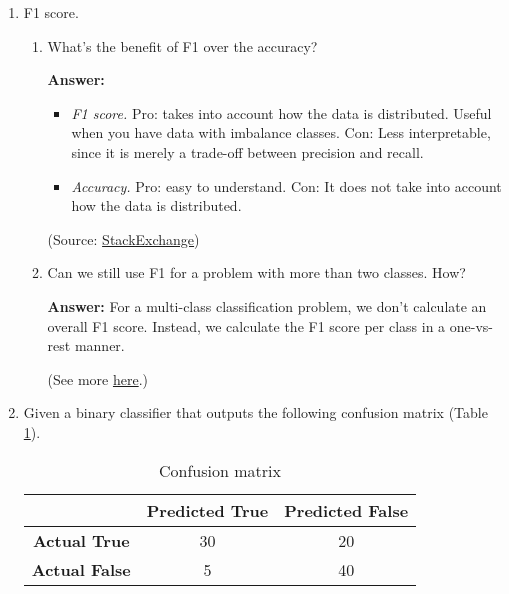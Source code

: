 \documentclass{article}
\newenvironment{QandA}{\begin{enumerate}[label=\arabic*.]}{\end{enumerate}}
\newenvironment{InnerQandA}{\begin{enumerate}[label=\roman*.]}{\end{enumerate}}
\newenvironment{answer}{\par\normalfont \textbf{Answer:}}{}
\begin{document}
\begin{QandA}
    \item F1 score.
    \begin{InnerQandA}
        \item What’s the benefit of F1 over the accuracy?
        \begin{answer}
            \begin{itemize}
                \item \textit{F1 score.} Pro: takes into account how the data is distributed. Useful when you have data with imbalance classes. Con: Less interpretable, since it is merely a trade-off between precision and recall.
                \item \textit{Accuracy.} Pro: easy to understand. Con: It does not take into account how the data is distributed.
            \end{itemize}

            (Source: \href{https://datascience.stackexchange.com/questions/65341/f1-score-vs-accuracy-which-metric-is-more-important}{StackExchange})
        \end{answer}

        \item Can we still use F1 for a problem with more than two classes. How?
        \begin{answer}
            For a multi-class classification problem, we don’t calculate an overall F1 score. Instead, we calculate the F1 score per class in a one-vs-rest manner. 

            (See more \href{https://www.baeldung.com/cs/multi-class-f1-score}{here}.)
        \end{answer}
    \end{InnerQandA}

    \item Given a binary classifier that outputs the following confusion matrix (Table \ref{tab:confusion-matrix}).

    \begin{table}[htb!]
    \centering
\begin{tabular}{|c|c|c|}
\hline
                      & \textbf{Predicted True} & \textbf{Predicted False} \\ \hline
\textbf{Actual True}  & 30                      & 20                       \\ \hline
\textbf{Actual False} & 5                       & 40                       \\ \hline
\end{tabular}
\caption{Confusion matrix}
\label{tab:confusion-matrix}
\end{table}
    

\end{QandA}
\end{document}
